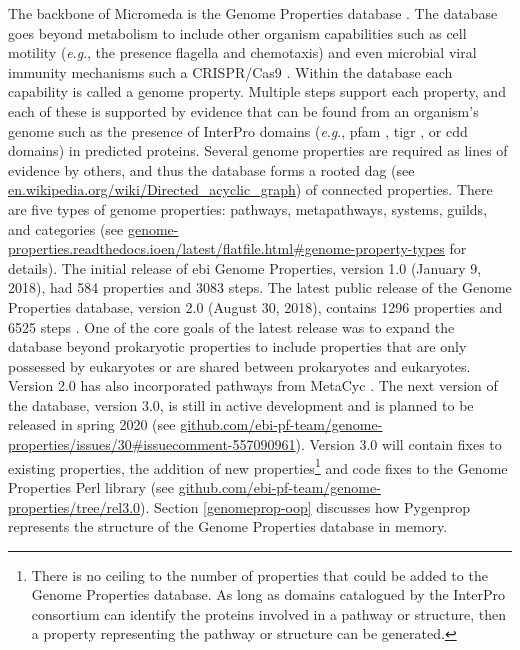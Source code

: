 The backbone of Micromeda is the Genome Properties database \cite{Haft2013}. The 
database goes beyond metabolism to include other organism capabilities such as 
cell motility (\textit{e}.\textit{g}., the presence flagella and chemotaxis) and 
even microbial viral immunity mechanisms such a CRISPR/Cas9 
\cite{horvath2010crispr}. Within the database each capability is called a genome 
property. Multiple steps support each property, and each of these is supported 
by evidence that can be found from an organism's genome such as the presence of 
InterPro domains (\textit{e}.\textit{g}., \gls{pfam} \cite{bateman2004pfam}, 
\gls{tigr} \cite{haft2001tigrfams}, or \gls{cdd} \cite{marchler2014cdd} domains) 
in predicted proteins. Several genome properties are required as lines of 
evidence by others, and thus the database forms a rooted \gls{dag} (see 
\href{http://en.wikipedia.org/wiki/Directed_acyclic_graph}{en.wikipedia.org/wiki/Directed\_acyclic\_graph}) 
of connected properties. There are five types of genome properties: pathways, 
metapathways, systems, guilds, and categories (see 
\href{http://genome-properties.readthedocs.io/en/latest/flatfile.html#genome-property-types}{genome-properties.readthedocs.ioen/latest/flatfile.html\#genome-property-types} 
for details). The initial release of \gls{ebi} Genome Properties, version 1.0 
(January 9, 2018), had 584 properties and 3083 steps. The latest public release 
of the Genome Properties database, version 2.0 (August 30, 2018), contains 1296 
properties and 6525 steps \cite{richardson2018genome}. One of the core goals of 
the latest release was to expand the database beyond prokaryotic properties to 
include properties that are only possessed by eukaryotes or are shared between 
prokaryotes and eukaryotes. Version 2.0 has also incorporated pathways from 
MetaCyc \cite{karp2002metacyc}. The next version of the database, version 3.0, 
is still in active development and is planned to be released in spring 2020 (see 
\href{http://github.com/ebi-pf-team/genome-properties/issues/30#issuecomment-557090961}{github.com/ebi-pf-team/genome-properties/issues/30\#issuecomment-557090961}). 
Version 3.0 will contain fixes to existing properties, the addition of new 
properties\footnote{There is no ceiling to the number of properties that could 
be added to the Genome Properties database. As long as domains catalogued by the 
InterPro consortium can identify the proteins involved in a pathway or 
structure, then a property representing the pathway or structure can be 
generated.} and code fixes to the Genome Properties Perl library (see 
\href{http://github.com/ebi-pf-team/genome-properties/tree/rel3.0}{github.com/ebi-pf-team/genome-properties/tree/rel3.0}). 
Section \ref{genomeprop-oop} discusses how Pygenprop represents the structure of 
the Genome Properties database in memory.

